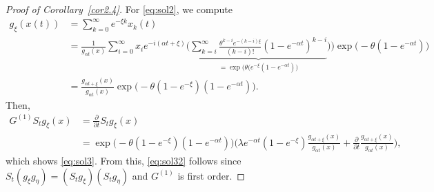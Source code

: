 \documentclass{imsart}
\theoremstyle{plain}
\theoremstyle{definition}
\begin{document}
\begin{proof}[Proof of Corollary~\ref{cor2.4}]
  For \eqref{eq:sol2}, we compute
  \begin{align*}
    g_{ \xi}(x(t)) & = \sum_{k=0}^\infty e^{- \xi k} x_k(t) \\ & = \frac{1}{g_{\alpha t}(x)} \! \sum_{i=0}^\infty x_i e^{-i(\alpha t+\xi)} \Big(\underbrace{ \sum_{k=i}^\infty  \frac{\theta^{k-i} e^{- (k-i)\xi}}{(k-i)!}
      (1-e^{-\alpha t})^{k-i}}_{= \exp\big( \theta(e^{- \xi} ( 1\! - e^{-\alpha t}) \big) }\Big)\Big)\exp\Big(\!-\theta(1 \! -e^{-\alpha t})\Big)\\ & =
    \frac{g_{\alpha t + \xi}(x)}{ g_{\alpha t}(x)}
    \exp\Big(-\theta(1-e^{- \xi})(1-e^{-\alpha t})\Big).
  \end{align*}
  Then,
  \begin{align*}
    G^{(1)}S_t g_{\xi}(x) & = \frac{\partial}{\partial t}S_t g_{\xi}(x) \\ & = \exp\Big(-\theta(1-e^{- \xi})(1-e^{-\alpha t})\Big)\Big(\lambda e^{-\alpha t}(1 - e^{- \xi})\frac{g_{\alpha  t + \xi}(x)}{g_{\alpha t}(x)} + \frac{\partial}{\partial t} \frac{g_{\alpha t + \xi}(x)}{g_{\alpha t}(x)}\Big),
\end{align*}
which shows \eqref{eq:sol3}. From this, \eqref{eq:sol32} follows since $S_t(g_{\xi} g_{\eta}) = (S_t g_{\xi})(S_tg_{\eta})$ and $G^{(1)}$ is first order. 


\end{proof}
\end{document}
